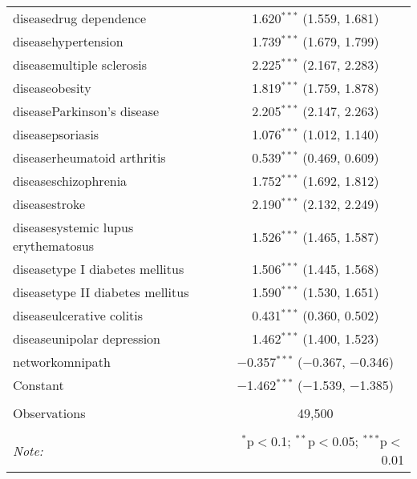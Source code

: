 \begin{table}[!htbp]
\begin{tabular}{@{\extracolsep{5pt}}lc}
  diseasedrug dependence & 1.620$^{***}$ (1.559, 1.681) \\ 
  diseasehypertension & 1.739$^{***}$ (1.679, 1.799) \\ 
  diseasemultiple sclerosis & 2.225$^{***}$ (2.167, 2.283) \\ 
  diseaseobesity & 1.819$^{***}$ (1.759, 1.878) \\ 
  diseaseParkinson's disease & 2.205$^{***}$ (2.147, 2.263) \\ 
  diseasepsoriasis & 1.076$^{***}$ (1.012, 1.140) \\ 
  diseaserheumatoid arthritis & 0.539$^{***}$ (0.469, 0.609) \\ 
  diseaseschizophrenia & 1.752$^{***}$ (1.692, 1.812) \\ 
  diseasestroke & 2.190$^{***}$ (2.132, 2.249) \\ 
  diseasesystemic lupus erythematosus & 1.526$^{***}$ (1.465, 1.587) \\ 
  diseasetype I diabetes mellitus & 1.506$^{***}$ (1.445, 1.568) \\ 
  diseasetype II diabetes mellitus & 1.590$^{***}$ (1.530, 1.651) \\ 
  diseaseulcerative colitis & 0.431$^{***}$ (0.360, 0.502) \\ 
  diseaseunipolar depression & 1.462$^{***}$ (1.400, 1.523) \\ 
  networkomnipath & $-$0.357$^{***}$ ($-$0.367, $-$0.346) \\ 
  Constant & $-$1.462$^{***}$ ($-$1.539, $-$1.385) \\ 
 \hline \\[-1.8ex] 
Observations & 49,500 \\ 
\hline 
\hline \\[-1.8ex] 
\textit{Note:}  & \multicolumn{1}{r}{$^{*}$p$<$0.1; $^{**}$p$<$0.05; $^{***}$p$<$0.01} \\ 
\end{tabular} 
\end{table} 
